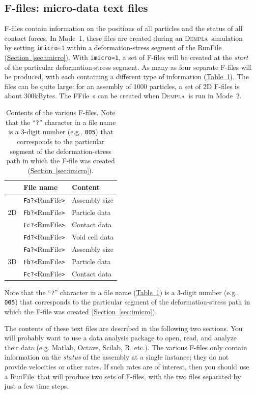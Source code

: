 \documentclass[letterpaper,11pt]{article}
\newcommand{\Dempla}{\textsc{Dempla}}
\newcommand{\RunFile}{\textsf{RunFile}}
\newcommand{\FFile}{\textsf{FFile}}
\begin{document}
\subsection{F-files: micro-data text files}\label{sec:ffiles}
F-files contain information on the positions of all particles
and the status of all contact forces.
In Mode~1,
these files are created during an \Dempla\ simulation
by setting \texttt{imicro=1} within a deformation-stress segment
of the \RunFile\ %
(\hyperref[sec:imicro]{Section~\ref*{sec:imicro}}).
With \texttt{imicro=1}, a set of F-files will be created at the \emph{start}
of the particular deformation-stress segment.
As many as four separate F-files will be produced, with each containing
a different type of information
(\hyperref[table:ffiles]{Table~\ref*{table:ffiles}}).
The files can be quite large:  for an assembly of 1000 particles, 
a set of 2D F-files is about 300kBytes.
The \FFile\ s can be created when \Dempla\ is run in Mode~2.
\begin{table}
\centering
\begin{tabular}{l|ll}
\hline
\hline
\multicolumn{1}{c}{} & File name & Content\\
\hline
   & \texttt{Fa?<}\RunFile\texttt{>} & Assembly size \\
2D & \texttt{Fb?<}\RunFile\texttt{>} & Particle data \\
   & \texttt{Fc?<}\RunFile\texttt{>} & Contact data \\
   & \texttt{Fd?<}\RunFile\texttt{>} & Void cell data \\
\hline
   & \texttt{Fa?<}\RunFile\texttt{>} & Assembly size \\
3D & \texttt{Fb?<}\RunFile\texttt{>} & Particle data \\
   & \texttt{Fc?<}\RunFile\texttt{>} & Contact data \\
\hline
\hline
\end{tabular}
\caption{Contents of the various F-files.
Note that the ``\texttt{?}'' character in a file name
is a 3-digit number (e.g., \texttt{005})
that corresponds to the particular
segment of the deformation-stress path in which the F-file was created
(\hyperref[sec:imicro]{Section~\ref*{sec:imicro}}).}
\label{table:ffiles}
\end{table}
Note that the ``\texttt{?}'' character in a file name 
(\hyperref[table:ffiles]{Table~\ref*{table:ffiles}})
is a 3-digit number (e.g., \texttt{005})
that corresponds to the particular
segment of the deformation-stress path in which the F-file was created
(\hyperref[sec:imicro]{Section~\ref*{sec:imicro}}).
\par
The contents of these text files are described in the following two sections.
You will probably want to use a data analysis package
to open, read, and analyze their data (e.g. Matlab, Octave, Scilab, R, etc.).
The various F-files only contain information on the \emph{status}
of the assembly at a single instance; they do not provide
velocities or other rates.
If such rates are of interest, then you should use
a \RunFile\ that will produce two sets of F-files, 
with the two files separated by
just a few time steps.
%
\end{document}
